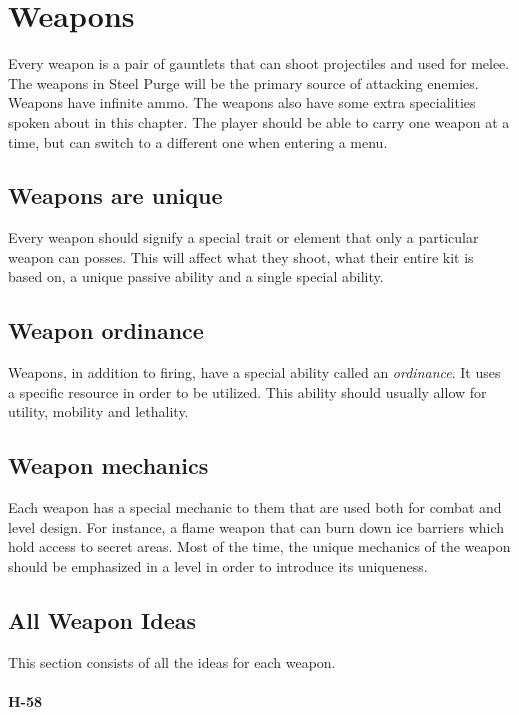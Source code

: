 \documentclass[../Main.tex]{subfiles}
\begin{document}
\section{Weapons}

Every weapon is a pair of gauntlets that can shoot projectiles and used for melee. The weapons in Steel Purge will be the primary source of attacking enemies. Weapons have infinite ammo. The weapons also have some extra specialities spoken about in this chapter. The player should be able to carry one weapon at a time, but can switch to a different one when entering a menu.

\subsection{Weapons are unique}

Every weapon should signify a special trait or element that only a particular weapon can posses. This will affect what they shoot, what their entire kit is based on, a unique passive ability and a single special ability. 

\subsection{Weapon ordinance}

Weapons, in addition to firing, have a special ability called an \emph{ordinance}. It uses a specific resource in order to be utilized. This ability should usually allow for utility, mobility and lethality.

\subsection{Weapon mechanics}

Each weapon has a special mechanic to them that are used both for combat and level design. For instance, a flame weapon that can burn down ice barriers which hold access to secret areas. Most of the time, the unique mechanics of the weapon should be emphasized in a level in order to introduce its uniqueness. 

\subsection{All Weapon Ideas}

This section consists of all the ideas for each weapon.

\paragraph{H-58}
\end{document}
